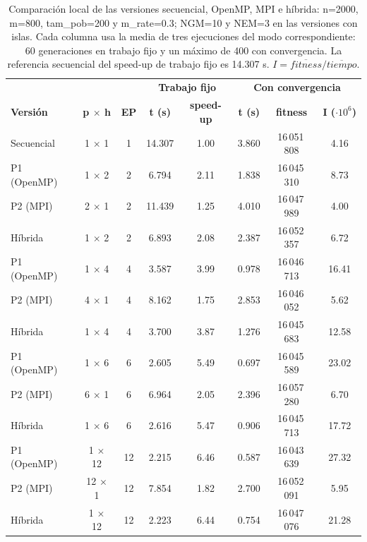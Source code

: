 \documentclass[12pt]{article}
\begin{document}
\begin{enumerate}
\begin{table}[htbp]
\centering
\small
\begin{tabular}{lcc|cc|ccc}
\toprule
 & & & \multicolumn{2}{c|}{\textbf{Trabajo fijo}} & \multicolumn{3}{c}{\textbf{Con convergencia}} \\
\textbf{Versión} & \textbf{p $\times$ h} & \textbf{EP} & \textbf{t (s)} & \textbf{speed-up} & \textbf{t (s)} & \textbf{fitness} & \textbf{I ($\cdot 10^6$)} \\
\midrule
Secuencial & 1 $\times$ 1 & 1 & 14.307 & 1.00 & 3.860 & 16\,051\,808 & 4.16 \\
\midrule
P1 (OpenMP) & 1 $\times$ 2 & 2 & 6.794 & 2.11 & 1.838 & 16\,045\,310 & 8.73 \\
P2 (MPI) & 2 $\times$ 1 & 2 & 11.439 & 1.25 & 4.010 & 16\,047\,989 & 4.00 \\
Híbrida & 1 $\times$ 2 & 2 & 6.893 & 2.08 & 2.387 & 16\,052\,357 & 6.72 \\
\midrule
P1 (OpenMP) & 1 $\times$ 4 & 4 & 3.587 & 3.99 & 0.978 & 16\,046\,713 & 16.41 \\
P2 (MPI) & 4 $\times$ 1 & 4 & 8.162 & 1.75 & 2.853 & 16\,046\,052 & 5.62 \\
Híbrida & 1 $\times$ 4 & 4 & 3.700 & 3.87 & 1.276 & 16\,045\,683 & 12.58 \\
\midrule
P1 (OpenMP) & 1 $\times$ 6 & 6 & 2.605 & 5.49 & 0.697 & 16\,045\,589 & 23.02 \\
P2 (MPI) & 6 $\times$ 1 & 6 & 6.964 & 2.05 & 2.396 & 16\,057\,280 & 6.70 \\
Híbrida & 1 $\times$ 6 & 6 & 2.616 & 5.47 & 0.906 & 16\,045\,713 & 17.72 \\
\midrule
P1 (OpenMP) & 1 $\times$ 12 & 12 & 2.215 & 6.46 & 0.587 & 16\,043\,639 & 27.32 \\
P2 (MPI) & 12 $\times$ 1 & 12 & 7.854 & 1.82 & 2.700 & 16\,052\,091 & 5.95 \\
Híbrida & 1 $\times$ 12 & 12 & 2.223 & 6.44 & 0.754 & 16\,047\,076 & 21.28 \\
\bottomrule
\end{tabular}
\caption{Comparación local de las versiones secuencial, OpenMP, MPI e híbrida: n=2000, m=800, tam\_pob=200 y m\_rate=0.3; NGM=10 y NEM=3 en las versiones con islas. Cada columna usa la media de tres ejecuciones del modo correspondiente: 60 generaciones en trabajo fijo y un máximo de 400 con convergencia. La referencia secuencial del speed-up de trabajo fijo es 14.307 s. $I=\overline{fitness}/\overline{tiempo}$.}
\label{tab:c2_comparacion}
\end{table}


\end{enumerate}
\end{document}
